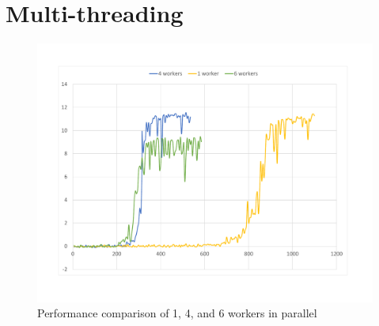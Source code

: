 \section{Multi-threading}

\begin{figure}[H]
	\centering
	\includegraphics[width=\textwidth]{Figures/Workers}
	\caption{Performance comparison of 1, 4, and 6 workers in parallel}
	\label{fig:Workers}
\end{figure}
